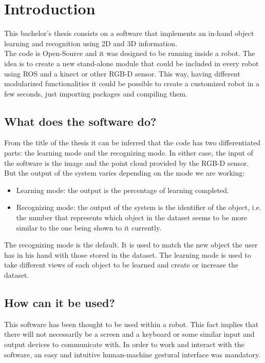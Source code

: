 \chapter*{Introduction}
This bachelor's thesis consists on a software that implements an in-hand object learning and recognition using 2D and 3D information. 
\\

The code is Open-Source and it was designed to be running inside a robot. The idea is to create a new stand-alone module that could be included in every robot using ROS and a kinect or other RGB-D sensor. This way, having different modularized functionalities it could be possible to create a customized robot in a few seconds, just importing packages and compiling them. 
\\

\section*{What does the software do?}
From the title of the thesis it can be inferred that the code has two differentiated parts: the learning mode and the recognizing mode. In either case, the input of the software is the image and the point cloud provided by the RGB-D sensor. 
But the output of the system varies depending on the mode we are working: 
\\
\begin{itemize}
	\item 	Learning mode:  the output is the percentage of learning completed. 
	\item   Recognizing mode: the output of the system is the identifier of the object, i.e. the number that represents which object in the dataset seems to be more similar to the one being shown to it currently. 
\end{itemize}

The recognizing mode is the default. It is used to match the new object the user has in his hand with those stored in the dataset. 
The learning mode is used to take different views of each object to be learned and create or increase the dataset. 


\section*{How can it be used?}
This software has been thought to be used within a robot. This fact implies that there will not necessarily be a screen and a keyboard or some similar input and output devices to communicate with. In order to work and interact with the software, an easy and intuitive human-machine gestural interface was mandatory.  
\\

